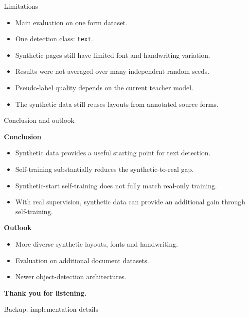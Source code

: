 \documentclass[aspectratio=1610,10pt]{beamer}
\begin{document}
\begin{frame}{Limitations}
\begin{itemize}
  \item Main evaluation on one form dataset.
  \item One detection class: \texttt{text}.
  \item Synthetic pages still have limited font and handwriting variation.
  \item Results were not averaged over many independent random seeds.
  \item Pseudo-label quality depends on the current teacher model.
  \item The synthetic data still reuses layouts from annotated source forms.
\end{itemize}
\end{frame}

\begin{frame}{Conclusion and outlook}

\textbf{Conclusion}
\begin{itemize}
  \item Synthetic data provides a useful starting point for text detection.
  \item Self-training substantially reduces the synthetic-to-real gap.
  \item Synthetic-start self-training does not fully match real-only training.
  \item With real supervision, synthetic data can provide an additional gain through self-training.
\end{itemize}

\vspace{0.5em}

\textbf{Outlook}
\begin{itemize}
  \item More diverse synthetic layouts, fonts and handwriting.
  \item Evaluation on additional document datasets.
  \item Newer object-detection architectures.
\end{itemize}

\vfill

\begin{center}
\Large\bfseries Thank you for listening.
\end{center}

\end{frame}

\iffalse
\begin{frame}{Backup: implementation details}
\begin{center}
\ImplementationTable
\end{center}
\end{frame}
\end{document}
